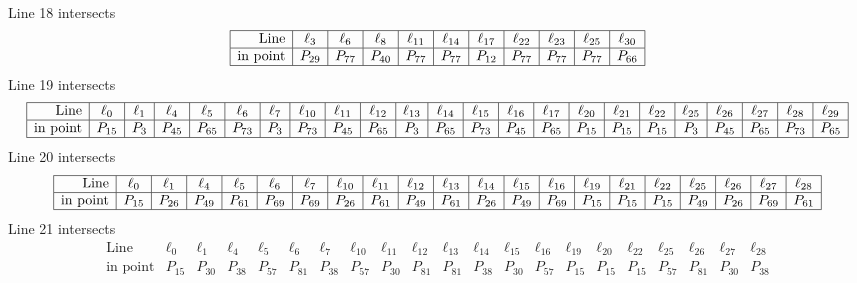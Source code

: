 \documentclass{article}
\begin{document}
{$$\begin{array}{|r*{10}{|c}|}
\end{array}
$$
Line 18 intersects 
$$
\begin{array}{|r*{10}{|c}|}
\hline
\mbox{Line}  & \ell_{3} & \ell_{6} & \ell_{8} & \ell_{11} & \ell_{14} & \ell_{17} & \ell_{22} & \ell_{23} & \ell_{25} & \ell_{30}\\
\hline
\mbox{in point}  & P_{29} & P_{77} & P_{40} & P_{77} & P_{77} & P_{12} & P_{77} & P_{77} & P_{77} & P_{66}\\
\hline
\end{array}
$$
Line 19 intersects 
$$
\begin{array}{|r*{22}{|c}|}
\hline
\mbox{Line}  & \ell_{0} & \ell_{1} & \ell_{4} & \ell_{5} & \ell_{6} & \ell_{7} & \ell_{10} & \ell_{11} & \ell_{12} & \ell_{13} & \ell_{14} & \ell_{15} & \ell_{16} & \ell_{17} & \ell_{20} & \ell_{21} & \ell_{22} & \ell_{25} & \ell_{26} & \ell_{27} & \ell_{28} & \ell_{29}\\
\hline
\mbox{in point}  & P_{15} & P_{3} & P_{45} & P_{65} & P_{73} & P_{3} & P_{73} & P_{45} & P_{65} & P_{3} & P_{65} & P_{73} & P_{45} & P_{65} & P_{15} & P_{15} & P_{15} & P_{3} & P_{45} & P_{65} & P_{73} & P_{65}\\
\hline
\end{array}
$$
Line 20 intersects 
$$
\begin{array}{|r*{20}{|c}|}
\hline
\mbox{Line}  & \ell_{0} & \ell_{1} & \ell_{4} & \ell_{5} & \ell_{6} & \ell_{7} & \ell_{10} & \ell_{11} & \ell_{12} & \ell_{13} & \ell_{14} & \ell_{15} & \ell_{16} & \ell_{19} & \ell_{21} & \ell_{22} & \ell_{25} & \ell_{26} & \ell_{27} & \ell_{28}\\
\hline
\mbox{in point}  & P_{15} & P_{26} & P_{49} & P_{61} & P_{69} & P_{69} & P_{26} & P_{61} & P_{49} & P_{61} & P_{26} & P_{49} & P_{69} & P_{15} & P_{15} & P_{15} & P_{49} & P_{26} & P_{69} & P_{61}\\
\hline
\end{array}
$$
Line 21 intersects 
$$
\begin{array}{|r*{20}{|c}|}
\hline
\mbox{Line}  & \ell_{0} & \ell_{1} & \ell_{4} & \ell_{5} & \ell_{6} & \ell_{7} & \ell_{10} & \ell_{11} & \ell_{12} & \ell_{13} & \ell_{14} & \ell_{15} & \ell_{16} & \ell_{19} & \ell_{20} & \ell_{22} & \ell_{25} & \ell_{26} & \ell_{27} & \ell_{28}\\
\hline
\mbox{in point}  & P_{15} & P_{30} & P_{38} & P_{57} & P_{81} & P_{38} & P_{57} & P_{30} & P_{81} & P_{81} & P_{38} & P_{30} & P_{57} & P_{15} & P_{15} & P_{15} & P_{57} & P_{81} & P_{30} & P_{38}\\

\end{array}$$}
\end{document}
